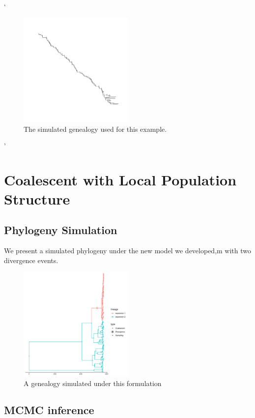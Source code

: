 \documentclass{ieeeaccess}
\theoremstyle{definition}
\begin{document}
`\begin{figure}[H]
  \centering
    \includegraphics[width=0.5\textwidth]{../R/tree}
    \caption{The simulated genealogy used for this example.}
\end{figure}'
\section{Coalescent with Local Population Structure}
\subsection{Phylogeny Simulation}
We present a simulated phylogeny under the new model we developed,m with two divergence events.
\begin{figure}[H]
  \centering
     \includegraphics[width=0.5\textwidth]{../R/tree_structured}
    \caption{A genealogy simulated under this formulation}
\end{figure}
\subsection{MCMC inference}
\end{document}
